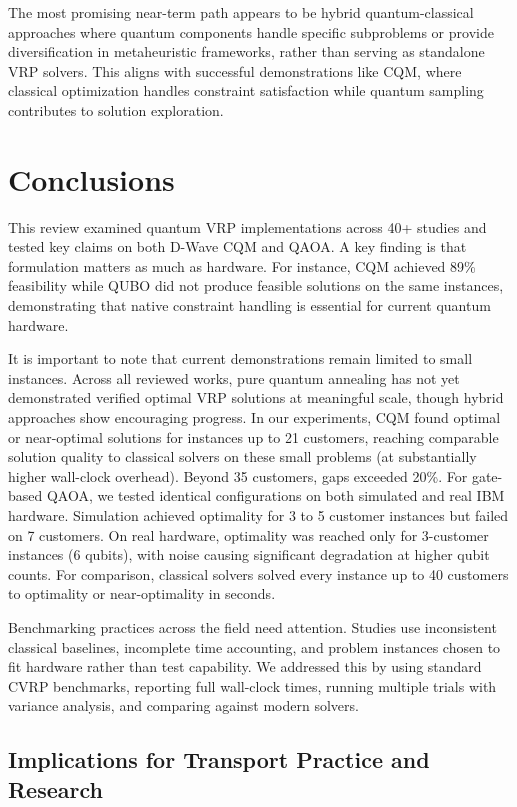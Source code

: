 \documentclass[preprint,3p,12pt,authoryear]{elsarticle}
\begin{document}
The most promising near-term path appears to be hybrid quantum-classical approaches where quantum components handle specific subproblems or provide diversification in metaheuristic frameworks, rather than serving as standalone VRP solvers. This aligns with successful demonstrations like CQM, where classical optimization handles constraint satisfaction while quantum sampling contributes to solution exploration.

\section{Conclusions}\label{sec:conclusions}

This review examined quantum VRP implementations across 40+ studies and tested key claims on both D-Wave CQM and QAOA. A key finding is that formulation matters as much as hardware. For instance, CQM achieved 89\% feasibility while QUBO did not produce feasible solutions on the same instances, demonstrating that native constraint handling is essential for current quantum hardware.

It is important to note that current demonstrations remain limited to small instances. Across all reviewed works, pure quantum annealing has not yet demonstrated verified optimal VRP solutions at meaningful scale, though hybrid approaches show encouraging progress. In our experiments, CQM found optimal or near-optimal solutions for instances up to 21 customers, reaching comparable solution quality to classical solvers on these small problems (at substantially higher wall-clock overhead). Beyond 35 customers, gaps exceeded 20\%. For gate-based QAOA, we tested identical configurations on both simulated and real IBM hardware. Simulation achieved optimality for 3 to 5 customer instances but failed on 7 customers. On real hardware, optimality was reached only for 3-customer instances (6 qubits), with noise causing significant degradation at higher qubit counts. {\color{red}For comparison, classical solvers solved every instance up to 40 customers to optimality or near-optimality in seconds.}

Benchmarking practices across the field need attention. Studies use inconsistent classical baselines, incomplete time accounting, and problem instances chosen to fit hardware rather than test capability. We addressed this by using standard CVRP benchmarks, reporting full wall-clock times, running multiple trials with variance analysis, and comparing against modern solvers.

\subsection*{Implications for Transport Practice and Research}
\end{document}
